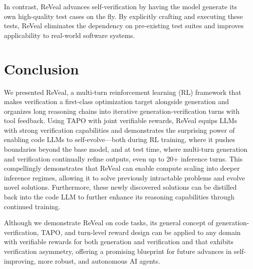 \documentclass{article} %
\begin{document}
In contrast, ReVeal advances self-verification by having the model generate its own high-quality test cases on the fly. By explicitly crafting and executing these tests, ReVeal eliminates the dependency on pre-existing test suites and improves applicability to real-world software systems.

\section{Conclusion}
\label{sec:Conclusion}
We presented ReVeal, a multi-turn reinforcement learning (RL) framework that makes verification a first-class optimization target alongside generation and organizes long reasoning chains into iterative generation-verification turns with tool feedback. Using TAPO with joint verifiable rewards, ReVeal equips LLMs with strong verification capabilities and demonstrates the surprising power of enabling code LLMs to self-evolve—both during RL training, where it pushes boundaries beyond the base model, and at test time, where multi-turn generation and verification continually refine outputs, even up to 20+ inference turns. This compellingly demonstrates that ReVeal can enable compute scaling into deeper inference regimes, allowing it to solve previously intractable problems and evolve novel solutions. Furthermore, these newly discovered solutions can be distilled back into the code LLM to further enhance its reasoning capabilities through continued training.

Although we demonstrate ReVeal on code tasks, its general concept of generation-verification, TAPO, and turn-level reward design can be applied to any domain with verifiable rewards for both generation and verification and that exhibits verification asymmetry, offering a promising blueprint for future advances in self-improving, more robust, and autonomous AI agents.
\end{document}
